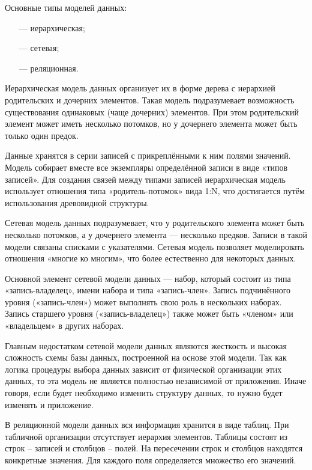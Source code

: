 Основные типы моделей данных:

\begin{itemize}[leftmargin=0.7cm +  - ]
	\item[---] иерархическая;
	\item[---] сетевая;
	\item[---] реляционная.
\end{itemize}

Иерархическая модель данных организует их в форме дерева с иерархией родительских и дочерних элементов. Такая модель подразумевает возможность существования одинаковых (чаще дочерних) элементов. При этом родительский элемент может иметь несколько потомков, но у дочернего элемента может быть только один предок.

Данные хранятся в серии записей с прикреплёнными к ним полями значений. Модель собирает вместе все экземпляры определённой записи в виде «типов записей». Для создания связей между типами записей иерархическая модель использует отношения типа «родитель-потомок» вида 1:N, что достигается путём использования древовидной структуры.

\pagebreak

Сетевая модель данных подразумевает, что у родительского элемента может быть несколько потомков, а у дочернего элемента — несколько предков. Записи в такой модели связаны списками с указателями. Сетевая модель позволяет моделировать отношения «многие ко многим», что более естественно для некоторых данных.

Основной элемент сетевой модели данных — набор, который состоит из типа «запись-владелец», имени набора и типа «запись-член». Запись подчинённого уровня («запись-член») может выполнять свою роль в нескольких наборах. Запись старшего уровня («запись-владелец») также может быть «членом» или «владельцем» в других наборах.

Главным недостатком сетевой модели данных являются жесткость и высокая сложность схемы базы данных, построенной на основе этой модели. Так как логика процедуры выбора данных зависит от физической организации этих данных, то эта модель не является полностью независимой от приложения. Иначе говоря, если будет необходимо изменить структуру данных, то нужно будет изменять и приложение.

В реляционной модели данных вся информация хранится в виде таблиц. При табличной организации отсутствует иерархия элементов. Таблицы состоят из строк – записей и столбцов – полей. На пересечении строк и столбцов находятся конкретные значения. Для каждого поля определяется множество его значений.

